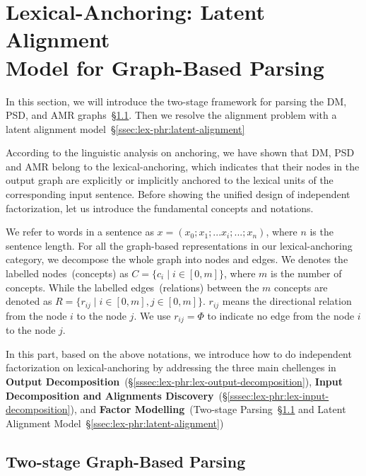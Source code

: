 \section[Lexical-Anchoring: Latent Alignment Model for Graph-Based
Parsing]{Lexical-Anchoring: Latent Alignment \\Model for Graph-Based Parsing}
\label{sec:lex-phr:graph-based}

In this section, we will introduce the two-stage framework for parsing
the DM, PSD, and AMR graphs~\S\ref{ssec:lex-phr:two-stage}. Then we
resolve the alignment problem with a latent alignment model~\S\ref{ssec:lex-phr:latent-alignment}


According to the linguistic analysis on anchoring, we have shown that
DM, PSD and AMR belong to the lexical-anchoring, which indicates that
their nodes in the output graph are explicitly or implicitly anchored
to the lexical units of the corresponding input sentence.  Before
showing the unified design of independent factorization, let us
introduce the fundamental concepts and notations.

We refer to words in a sentence as
$x=(x_{0};x_{1};...x_{i};...;x_{n})$, where $n$ is the sentence
length.  For all the graph-based representations in our
lexical-anchoring category, we decompose the whole graph into nodes
and edges. We denotes the labelled nodes~(concepts) as
$C = \{c_{i}\mid i \in [0,m]\}$, where $m$ is the number of concepts.
While the labelled edges~(relations) between the $m$ concepts are
denoted as $R = \{r_{ij}\mid i \in [0, m], j \in [0, m]\}$.  $r_{ij}$ means
the directional relation from the node $i$ to the node $j$.  We use
$r_{ij}=\Phi$ to indicate no edge from the node $i$ to the node $j$.

In this part, based on the above notations, we introduce how to do
independent factorization on lexical-anchoring by addressing the three
main chellenges in \textbf{Output
  Decomposition}~(\S\ref{sssec:lex-phr:lex-output-decomposition}),
\textbf{Input Decomposition and Alignments
  Discovery}~(\S\ref{sssec:lex-phr:lex-input-decomposition}), and
\textbf{Factor Modelling}~(Two-stage
Parsing~\S\ref{ssec:lex-phr:two-stage} and Latent Alignment
Model~\S\ref{ssec:lex-phr:latent-alignment})



\subsection{Two-stage Graph-Based Parsing}
\label{ssec:lex-phr:two-stage}

